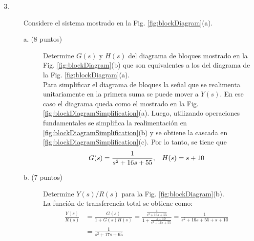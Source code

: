 \documentclass[11pt, spanish]{article}
\begin{document}
\begin{description}
			\item [3.] Considere el sistema mostrado en la Fig. \ref{fig:blockDiagram}(a).
			\begin{description}
				\item [a. (8 puntos)] Determine $G(s)$ y $H(s)$ del diagrama de bloques mostrado en la Fig. \ref{fig:blockDiagram}(b) que son equivalentes a los del diagrama de la Fig. \ref{fig:blockDiagram}(a).\\
				Para simplificar el diagrama de bloques la señal que se realimenta unitariamente en la primera suma se puede mover a $Y(s)$. En ese caso el diagrama queda como el mostrado en la Fig. \ref{fig:blockDiagramSimplification}(a). Luego, utilizando operaciones fundamentales se simplifica la realimentación en \ref{fig:blockDiagramSimplification}(b) y se obtiene la cascada en \ref{fig:blockDiagramSimplification}(c). Por lo tanto, se tiene que
				\begin{equation*}
					G(s) = \frac{1}{s^2+16s+55}, \hspace*{3mm} H(s) = s+10
				\end{equation*}

				\item [b. (7 puntos)] Determine $Y(s)/R(s)$ para la Fig. \ref{fig:blockDiagram}(b).\\
				La función de transferencia total se obtiene como:
				\begin{align*}
					\frac{Y(s)}{R(s)} &= \frac{G(s)}{1+G(s)H(s)} = \frac{\frac{1}{s^2+16s+55}}{1+\frac{s+10}{s^2+16s+55}} = \frac{1}{s^2+16s+55+s+10}\\
					&= \frac{1}{s^2+17s+65}
				\end{align*}


\end{description}
\end{description}
\end{document}
